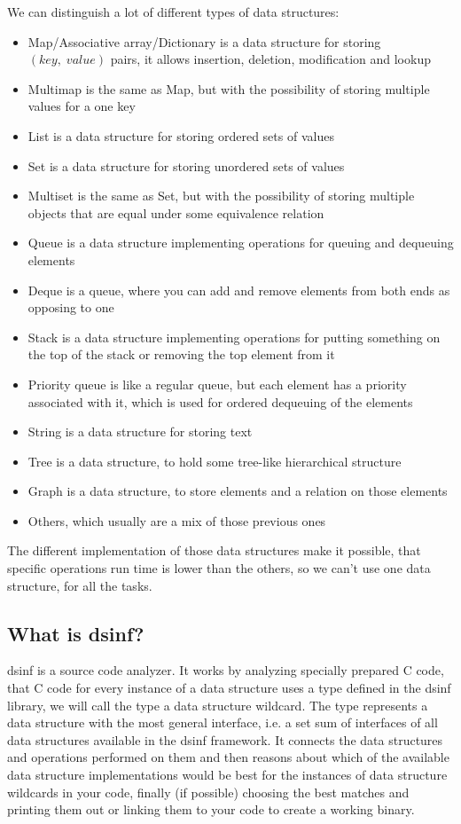 \documentclass[a4paper,11pt]{article}
\begin{document}
	We can distinguish a lot of different types of data structures:
	\begin{itemize}
		\item Map/Associative array/Dictionary is a data structure for storing $(key,\;value)$ pairs, it allows
			insertion, deletion, modification and lookup
		\item Multimap is the same as Map, but with the possibility of storing multiple values for a one key
		\item List is a data structure for storing ordered sets of values
		\item Set is a data structure for storing unordered sets of values
		\item Multiset is the same as Set, but with the possibility of storing multiple objects that are equal
			under some equivalence relation
		\item Queue is a data structure implementing operations for queuing and dequeuing elements
		\item Deque is a queue, where you can add and remove elements from both ends as opposing to one
		\item Stack is a data structure implementing operations for putting something on the top of the stack or
			removing the top element from it
		\item Priority queue is like a regular queue, but each element has a priority associated with it, which
			is used for ordered dequeuing of the elements
		\item String is a data structure for storing text
		\item Tree is a data structure, to hold some tree-like hierarchical structure
		\item Graph is a data structure, to store elements and a relation on those elements
		\item Others, which usually are a mix of those previous ones
	\end{itemize}

	The different implementation of those data structures make it possible, that specific operations run time is
	lower than the others, so we can't use one data structure, for all the tasks.

	\subsection{What is dsinf?} \label{sub:intro}

		dsinf is a source code analyzer. It works by analyzing specially prepared C code, that C code for every
		instance of a data structure uses a type defined in the dsinf library, we will call the type a data
		structure wildcard. The type represents a data structure with the most general interface, i.e. a set sum
		of interfaces of all data structures available in the dsinf framework. It connects the data structures
		and operations performed on them and then reasons about which of the available data structure
		implementations would be best for the instances of data structure wildcards in your code, finally (if
		possible) choosing the best matches and printing them out or linking them to your code to create a
		working binary.
\end{document}
